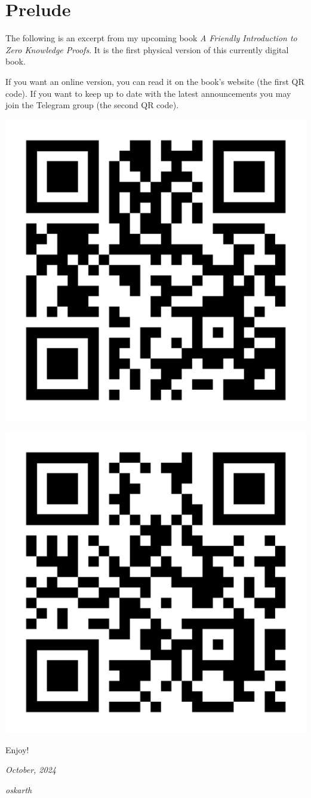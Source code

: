 \section*{Prelude}
\vspace{0.5cm}

The following is an excerpt from my upcoming book \textit{A Friendly Introduction to Zero Knowledge Proofs}. 
It is the first physical version of this currently digital book.

If you want an online version, you can read it on the book's website (the first QR code).
If you want to keep up to date with the latest announcements you may join the Telegram group (the second QR code).

\vspace{1cm}

\begin{center}
\includegraphics[width=0.3\linewidth]{public/static/images/zkintro_website_qrcode.png}
\end{center}

\vspace{0.5cm}

\begin{center}
\includegraphics[width=0.3\linewidth]{public/static/images/zkintro_tg_group_qrcode.png}
\end{center}

\vspace{1cm}

Enjoy!

\textit{October, 2024}

\textit{oskarth}

\thispagestyle{empty}